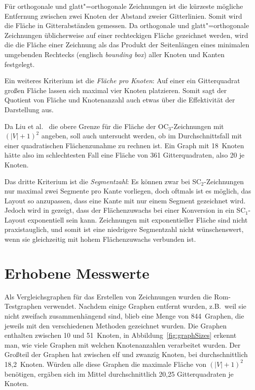 \documentclass[a4paper]{scrreprt}
\theoremstyle{definition}
\begin{document}
Für orthogonale und glatt"=orthogonale Zeichnungen ist die kürzeste mögliche Entfernung zwischen zwei Knoten der Abstand zweier Gitterlinien. Somit wird die Fläche in Gitterabständen gemessen. Da orthogonale und glatt"=orthogonale Zeichnungen üblicherweise auf einer rechteckigen Fläche gezeichnet werden, wird die die Fläche einer Zeichnung als das Produkt der Seitenlängen eines minimalen umgebenden Rechtecks (englisch \emph{bounding box}) aller Knoten und Kanten festgelegt.

Ein weiteres Kriterium ist die \emph{Fläche pro Knoten}: Auf einer ein Gitterquadrat großen Fläche lassen sich maximal vier Knoten platzieren. Somit sagt der Quotient von Fläche und Knotenanzahl auch etwas über die Effektivität der Darstellung aus.

Da Liu et al.~\cite{liu+etal-98} die obere Grenze für die Fläche der OC$_3$-Zeichnungen mit $(|V|+1)^2$ angeben, soll auch untersucht werden, ob im Durchschnittsfall mit einer quadratischen Flächenzunahme zu rechnen ist. Ein Graph mit 18~Knoten hätte also im schlechtesten Fall eine Fläche von 361 Gitterquadraten, also 20 je Knoten.

Das dritte Kriterium ist die \emph{Segmentzahl}: Es können zwar bei SC$_2$-Zeichnungen nur maximal zwei Segmente pro Kante vorliegen, doch oftmals ist es möglich, das Layout so anzupassen, dass eine Kante mit nur einem Segment gezeichnet wird.  Jedoch wird in \cite{bekos-13} gezeigt, dass der Flächenzuwachs bei einer Konversion in ein SC$_1$-Layout exponentiell sein kann. Zeichnungen mit exponentieller Fläche sind nicht praxistauglich, und somit ist eine niedrigere Segmentzahl nicht wünschenswert, wenn sie gleichzeitig mit hohem Flächenzuwachs verbunden ist.

\section{Erhobene Messwerte}

Als Vergleichsgraphen für das Erstellen von Zeichnungen wurden die Rom-Testgraphen verwendet. Nachdem einige Graphen entfernt wurden, z.B.\ weil sie nicht zweifach zusammenhängend sind, blieb eine Menge von 844~Graphen, die jeweils mit den verschiedenen Methoden gezeichnet wurden. Die Graphen enthalten zwischen 10 und 51~Knoten, in Abbildung~\ref{fig:graphSizes} erkennt man, wie viele Graphen mit welchen Knotenanzahlen verarbeitet wurden. Der Großteil der Graphen hat zwischen elf und zwanzig Knoten, bei durchschnittlich 18,2~Knoten. Würden alle diese Graphen die maximale Fläche von $(|V|+1)^2$ benötigen, ergäben sich im Mittel durchschnittlich 20,25 Gitterquadraten je Knoten.
\end{document}
